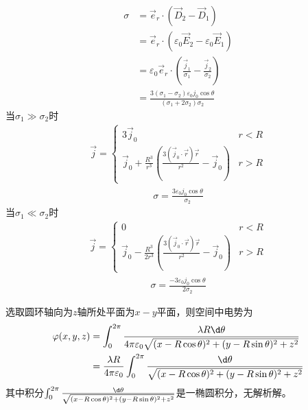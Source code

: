 \documentclass{phyasgn}
\begin{document}
\begin{sol}[6]
  \begin{align*}
    \sigma&=\vec{e}_r\cdot(\vec{D}_2-\vec{D}_1)\\
    &=\vec{e}_r\cdot(\varepsilon_0\vec{E}_2-\varepsilon_0\vec{E}_1)\\
    &=\varepsilon_0\vec{e}_r\cdot(\frac{\vec{j}_1}{\sigma_1}-\frac{\vec{j}_2}{\sigma_2})\\
    &=\frac{3(\sigma_1-\sigma_2)\varepsilon_0j_0\cos\theta}{(\sigma_1+2\sigma_2)\sigma_2}
  \end{align*}
  当$\sigma_1\gg \sigma_2$时
  \begin{align*}
    \vec{j}=\left\{\begin{matrix}
      3\vec{j}_0&r<R\\
      \vec{j}_0+\frac{R^3}{r^3}(\frac{3(\vec{j}_0\cdot\vec{r})\vec{r}}{r^2}-\vec{j}_0)&r>R
    \end{matrix}\right.
  \end{align*}
  \begin{align*}
    \sigma=\frac{3\varepsilon_0j_0\cos\theta}{\sigma_2}
  \end{align*}
  当$\sigma_1\ll  \sigma_2$时
  \begin{align*}
    \vec{j}=\left\{\begin{matrix}
      0&r<R\\
      \vec{j}_0-\frac{R^3}{2r^3}(\frac{3(\vec{j}_0\cdot\vec{r})\vec{r}}{r^2}-\vec{j}_0)&r>R
    \end{matrix}\right.
  \end{align*}
  \begin{align*}
    \sigma=\frac{-3\varepsilon_0j_0\cos\theta}{2\sigma_2}
  \end{align*}
\end{sol} 

\begin{sol}[7]
  选取圆环轴向为$z$轴所处平面为$x-y$平面，则空间中电势为
  \begin{align*}
    \varphi(x,y,z)&=\int_{0}^{2\pi}\frac{\lambda R\d\theta}{4\pi\varepsilon_0\sqrt{(x-R\cos\theta)^2+(y-R\sin\theta)^2+z^2}}\\
    &=\frac{\lambda R}{4\pi\varepsilon_0}\int_{0}^{2\pi}\frac{\d\theta}{\sqrt{(x-R\cos\theta)^2+(y-R\sin\theta)^2+z^2}}\\
  \end{align*}
  其中积分$\int_{0}^{2\pi}\frac{\d\theta}{\sqrt{(x-R\cos\theta)^2+(y-R\sin\theta)^2+z^2}}$是一椭圆积分，无解析解。
\end{sol}
\end{document}
